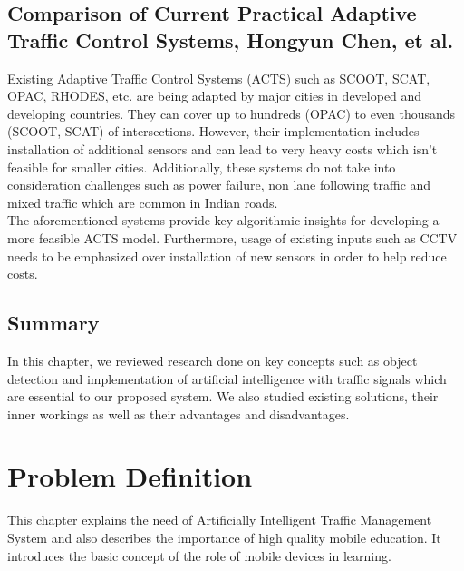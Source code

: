 \documentclass[openany,12pt]{report}
\begin{document}
\section{Comparison of Current Practical Adaptive Traffic Control Systems, Hongyun Chen, et al. \cite{paper4}}
\hspace*{0.5in}Existing Adaptive Traffic Control Systems (ACTS) such as SCOOT, SCAT, OPAC, RHODES, etc. are being adapted by major cities in developed and developing countries. They can cover up to hundreds (OPAC) to even thousands (SCOOT, SCAT) of intersections. However, their implementation includes installation of additional sensors and can lead to very heavy costs which isn't feasible for smaller cities. Additionally, these systems do not take into consideration challenges such as power failure, non lane following traffic and mixed traffic which are common in Indian roads.\\
\hspace*{0.5in}The aforementioned systems provide key algorithmic insights for developing a more feasible ACTS model. Furthermore, usage of existing inputs such as CCTV needs to be emphasized over installation of new sensors in order to help reduce costs.\\

\section{Summary}
\hspace*{0.5in}In this chapter, we reviewed research done on key concepts such as object detection and implementation of artificial intelligence with traffic signals which are essential to our proposed system. We also studied existing solutions, their inner workings as well as their advantages and disadvantages.\\



\chapter{Problem Definition}

\hspace*{0.5in}This chapter explains the need of Artificially Intelligent Traffic Management System and also describes the importance of high quality mobile education. It introduces the basic concept of the role of mobile devices in learning.\\
\end{document}

